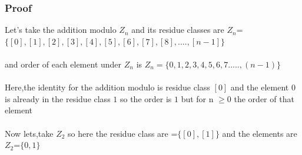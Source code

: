 \documentclass{article}
\begin{document}
\subsubsection{Proof}
Let's take the addition modulo $Z_n$ and its residue classes are $Z_{n}$=$\{[0],[1],[2],[3],[4],[5],[6],[7],[8],....,[n-1]\}$ \\\\
and order of each element under $Z_n$ is $Z_n =\{0,1,2,3,4,5,6,7.....,(n-1)\}$\\\\
Here,the identity for the addition modulo is residue class $[0]$ and the element $0$ is already in the residue class $1$ so the order is $1$ but for n $\geq 0$ the order of that element\\\\

Now lets,take $Z_2$ so here the residue class are =$\{[0],[1]\}$ and the elements are $Z_2$=$\{0,1\}$\\\\
\end{document}
